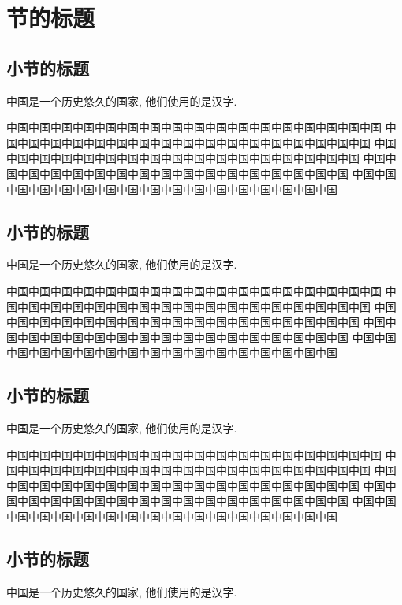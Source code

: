 \section{节的标题}

\subsection{小节的标题}

中国是一个历史悠久的国家, 他们使用的是汉字.

中国中国中国中国中国中国中国中国中国中国中国中国中国中国中国中国中国
中国中国中国中国中国中国中国中国中国中国中国中国中国中国中国中国\citep{aigner2007}中国
中国中国中国中国中国中国中国中国中国中国中国中国中国中国中国中国中国
中国中国中国中国中国中国中国中国中国中国中国中国中国中国中国中国中国
中国中国中国中国中国中国中国中国中国中国中国中国中国中国中国中国中国

\subsection{小节的标题}

中国是一个历史悠久的国家, 他们使用的是汉字.

中国中国中国中国中国中国中国中国中国中国中国中国中国中国中国中国中国
中国中国中国中国中国中国中国中国中国中国中国中国中国中国中国中国中国
中国中国中国中国中国中国中国中国中国中国中国中国中国中国中国中国中国
中国中国中国中国中国中国中国中国中国中国中国中国中国中国中国中国中国
中国中国中国中国中国中国中国中国中国中国中国中国中国中国中国中国中国

\subsection{小节的标题}

中国是一个历史悠久的国家, 他们使用的是汉字.

中国中国中国中国中国中国中国中国中国中国中国中国中国中国中国中国中国
中国中国中国中国中国中国中国中国中国中国中国中国中国中国中国中国中国
中国中国中国中国中国中国中国中国中国中国中国中国中国中国中国中国中国
中国中国中国中国中国中国中国中国中国中国中国中国中国中国中国中国中国
中国中国中国中国中国中国中国中国中国中国中国中国中国中国中国中国中国

\subsection{小节的标题}

中国是一个历史悠久的国家, 他们使用的是汉字.

